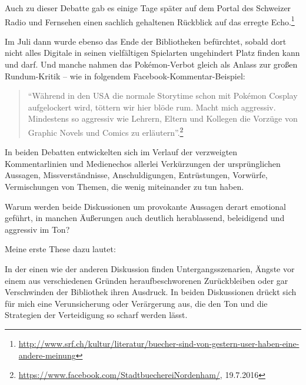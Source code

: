\documentclass[a4paper,
fontsize=11pt,
oneside,
numbers=noperiodatend,
parskip=half-,
bibliography=totoc,
final
]{scrartcl}
\begin{document}
Auch zu dieser Debatte gab es einige Tage später auf dem Portal des
Schweizer Radio und Fernsehen einen sachlich gehaltenen Rückblick auf
das erregte Echo.\footnote{\url{http://www.srf.ch/kultur/literatur/buecher-sind-von-gestern-user-haben-eine-andere-meinung}}

Im Juli dann wurde ebenso das Ende der Bibliotheken befürchtet, sobald
dort nicht alles Digitale in seinen vielfältigen Spielarten ungehindert
Platz finden kann und darf. Und manche nahmen das Pokémon-Verbot gleich
als Anlass zur großen Rundum-Kritik -- wie in folgendem
Facebook-Kommentar-Beispiel:

\begin{quote}
\enquote{Während in den USA die normale Storytime schon mit Pokémon
Cosplay aufgelockert wird, töttern wir hier blöde rum. Macht mich
aggressiv. Mindestens so aggressiv wie Lehrern, Eltern und Kollegen die
Vorzüge von Graphic Novels und Comics zu erläutern}.\footnote{\url{https://www.facebook.com/StadtbuechereiNordenham/},
  19.7.2016}
\end{quote}

In beiden Debatten entwickelten sich im Verlauf der verzweigten
Kommentarlinien und Medienechos allerlei Verkürzungen der ursprünglichen
Aussagen, Missverständnisse, Anschuldigungen, Entrüstungen, Vorwürfe,
Vermischungen von Themen, die wenig miteinander zu tun haben.

Warum werden beide Diskussionen um provokante Aussagen derart emotional
geführt, in manchen Äußerungen auch deutlich herablassend, beleidigend
und aggressiv im Ton?

Meine erste These dazu lautet:

In der einen wie der anderen Diskussion finden Untergangsszenarien,
Ängste vor einem aus verschiedenen Gründen heraufbeschworenen
Zurückbleiben oder gar Verschwinden der Bibliothek ihren Ausdruck. In
beiden Diskussionen drückt sich für mich eine Verunsicherung oder
Verärgerung aus, die den Ton und die Strategien der Verteidigung so
scharf werden lässt.
\end{document}
